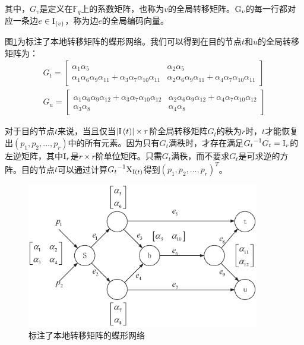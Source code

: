 其中，$G_{v}$是定义在$\mathbb{F}_{q}$上的系数矩阵，也称为$v$的全局转移矩阵。${\rm G}_{v}$的每一行都对应一条边$e \in {\rm I}_{\left( v \right)}$，称为边$e$的全局编码向量。
\par
图\ref{ZHUANYI_EPS}为标注了本地转移矩阵的蝶形网络。我们可以得到在目的节点$t$和$u$的全局转移矩阵为：
\begin{eqnarray}\label{eq23}
{G_t} = \left[ {\begin{array}{*{20}{c}}
	{{\alpha _1}{\alpha _5}}&{{\alpha _2}{\alpha _5}}\\
	{{\alpha _1}{\alpha _6}{\alpha _9}{\alpha _{11} }+{\alpha _3}{\alpha _7}{\alpha _{10}}{\alpha _{11} }}&{{\alpha _2}{\alpha _6}{\alpha _9}{\alpha _{11}}+{\alpha _4}{\alpha _7}{\alpha _{10}}{\alpha _{11}}}
	\end{array}} \right] \nonumber \\
{G_u}= \left[ {\begin{array}{*{20}{c}}
	{{\alpha _1}{\alpha _6}{\alpha _9}{\alpha _{12} }+{\alpha _3}{\alpha _7}{\alpha _{10}}{\alpha _{12} }}&{{\alpha _2}{\alpha _6}{\alpha _9}{\alpha _{12}}+{\alpha _4}{\alpha _7}{\alpha _{10}}{\alpha _{12}}}\\
	{{\alpha _3}{\alpha _8}}&{{\alpha _4}{\alpha _8}}
	\end{array}} \right]
\end{eqnarray}
\par
对于目的节点$t$来说，当且仅当$\left|{\rm I}\left(t\right)\right| \times r$阶全局转移矩阵$G_{t}$的秩为$r$时，$t$才能恢复出$\left(p_1,p_2,\dots,p_r\right)$中的所有元素。因为只有$G_t$满秩时，才存在满足${G_t}^{-1}G_t={\rm I}_r$的左逆矩阵，其中${\rm I}_r$是$r \times r$阶单位矩阵。只需$G_{t}$满秩，而不要求$G_{t}$是可求逆的方阵。目的节点$t$可以通过计算${G_t}^{-1}{\rm X}_{{\rm I}\left(t\right)}$得到$\left(p_1,p_2,\dots,p_r\right)^{T}$。
\begin{figure}[htbp]
	\centering
	\includegraphics[width=4in]{figures/zhuanyi.eps}
	\caption{标注了本地转移矩阵的蝶形网络}
	\label{ZHUANYI_EPS}
\end{figure}
